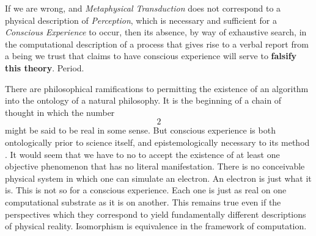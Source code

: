 \documentclass[runningheads]{llncs}
\begin{document}
If we are wrong, and \emph{Metaphysical Transduction} does not correspond to a physical description of \emph{Perception}, which is necessary and sufficient for a \emph{Conscious Experience} to occur, then its absence, by way of exhaustive search, in the computational description of a process that gives rise to a verbal report from a being we trust that claims to have conscious experience will serve to \textbf{falsify this theory}. Period.

There are philosophical ramifications to permitting the existence of an algorithm into the ontology of a natural philosophy. It is the beginning of a chain of thought in which the number $$2$$ might be said to be real in some sense. But conscious experience is both ontologically prior to science itself, and epistemologically necessary to its method \cite{Chalmers1996}\cite{KantSynthetic}. It would seem that we have to no to accept the existence of at least one objective phenomenon that has no literal manifestation. There is no conceivable physical system in which one can simulate an electron. An electron is just what it is. This is not so for a conscious experience. Each one is just as real on one computational substrate as it is on another. This remains true even if the perspectives which they correspond to yield fundamentally different descriptions of physical reality. Isomorphism is equivalence in the framework of computation.
\end{document}
